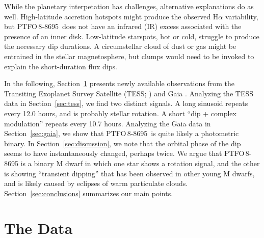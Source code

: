 \documentclass[12pt,twocolumn,tighten]{aastex62}
\newcommand{\ptfo}{PTFO$\,$8-8695}
\begin{document}
While the planetary interpetation has challenges, alternative
explanations do as well.  High-latitude accretion hotspots might
produce the observed H$\alpha$ variability, but \ptfo\ does not have
an infrared (IR) excess associated with the presence of an inner disk.
Low-latitude starspots, hot or cold, struggle to produce the necessary
dip durations.  A circumstellar cloud of dust or gas might be
entrained in the stellar magnetosphere, but clumps would need to be
invoked to explain the short-duration flux dips. 

In the following, Section~\ref{sec:observations} presents newly
available observations from the Transiting Exoplanet Survey Satellite
(TESS; \citealt{ricker_transiting_2015}) and Gaia
\citep{gaia_collaboration_gaia_2018}.  Analyzing the TESS data in
Section~\ref{sec:tess}, we find two distinct signals.  A long sinusoid
repeats every 12.0 hours, and is probably stellar rotation.  A short
``dip + complex modulation'' repeats every 10.7 hours.  Analyzing the
Gaia data in Section~\ref{sec:gaia}, we show that \ptfo\ is quite
likely a photometric binary.  In Section~\ref{sec:discussion}, we note
that the orbital phase of the dip seems to have instantaneously
changed, perhaps twice.  We argue that PTFO$\,$8-8695 is a binary M
dwarf in which one star shows a rotation signal, and the other is
showing ``transient dipping'' that has been observed in other young M
dwarfs, and is likely caused by eclipses of warm particulate clouds.
Section~\ref{sec:conclusions} summarizes our main points.


\section{The Data}
\label{sec:observations}
\end{document}
